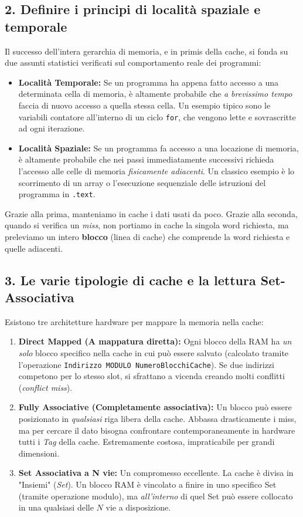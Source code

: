 \documentclass[12pt, a4paper]{article}
\begin{document}
\subsection{2. Definire i principi di località spaziale e temporale}
Il successo dell'intera gerarchia di memoria, e in primis della cache, si fonda su due assunti statistici verificati sul comportamento reale dei programmi:
\begin{itemize}
    \item \textbf{Località Temporale:} Se un programma ha appena fatto accesso a una determinata cella di memoria, è altamente probabile che \textit{a brevissimo tempo} faccia di nuovo accesso a quella stessa cella. Un esempio tipico sono le variabili contatore all'interno di un ciclo \texttt{for}, che vengono lette e sovrascritte ad ogni iterazione.
    \item \textbf{Località Spaziale:} Se un programma fa accesso a una locazione di memoria, è altamente probabile che nei passi immediatamente successivi richieda l'accesso alle celle di memoria \textit{fisicamente adiacenti}. Un classico esempio è lo scorrimento di un array o l'esecuzione sequenziale delle istruzioni del programma in \texttt{.text}.
\end{itemize}
Grazie alla prima, manteniamo in cache i dati usati da poco. Grazie alla seconda, quando si verifica un \textit{miss}, non portiamo in cache la singola word richiesta, ma preleviamo un intero \textbf{blocco} (linea di cache) che comprende la word richiesta e quelle adiacenti.

\subsection{3. Le varie tipologie di cache e la lettura Set-Associativa}
Esistono tre architetture hardware per mappare la memoria nella cache:
\begin{enumerate}
    \item \textbf{Direct Mapped (A mappatura diretta):} Ogni blocco della RAM ha \textit{un solo} blocco specifico nella cache in cui può essere salvato (calcolato tramite l'operazione \texttt{Indirizzo MODULO NumeroBlocchiCache}). Se due indirizzi competono per lo stesso slot, si sfrattano a vicenda creando molti conflitti (\textit{conflict miss}).
    \item \textbf{Fully Associative (Completamente associativa):} Un blocco può essere posizionato in \textit{qualsiasi} riga libera della cache. Abbassa drasticamente i miss, ma per cercare il dato bisogna confrontare contemporaneamente in hardware tutti i \textit{Tag} della cache. Estremamente costosa, impraticabile per grandi dimensioni.
    \item \textbf{Set Associativa a N vie:} Un compromesso eccellente. La cache è divisa in "Insiemi" (\textit{Set}). Un blocco RAM è vincolato a finire in uno specifico Set (tramite operazione modulo), ma \textit{all'interno} di quel Set può essere collocato in una qualsiasi delle $N$ vie a disposizione.
\end{enumerate}
\end{document}
